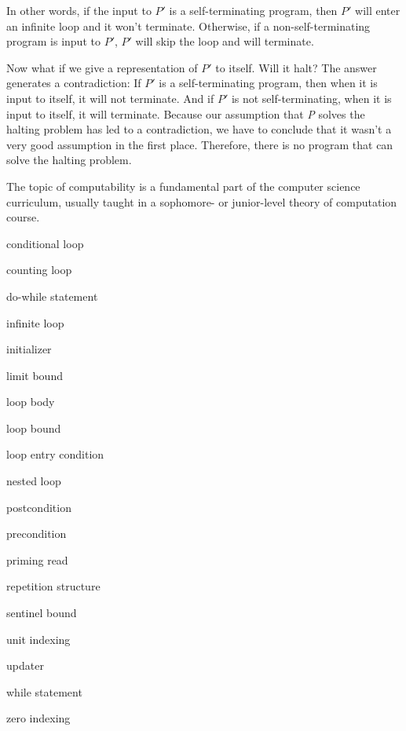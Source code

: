 \noindent In other words, if the input to $P\prime$  is a self-terminating
program, then $P\prime$ will enter an infinite loop and it won't
terminate.  Otherwise, if a non-self-terminating program is input to
$P\prime$, $P\prime$ will skip the loop and will terminate.

Now what if we give a representation of $P\prime$ to itself. Will it halt?
The answer generates a contradiction: If $P\prime$  is a self-terminating
program, then when it is input to itself, it will not terminate.  And
if $P\prime$ is not self-terminating, when it is input to itself, it will
terminate. Because our assumption that {\it P} solves the halting problem
has led to a contradiction, we have to conclude that it wasn't a very
good assumption in the first place. Therefore, there is no program
that can solve the halting problem.

The topic of computability is a fundamental part of the computer
science curriculum, usually taught in a sophomore- or junior-level
theory of computation course.


\begin{KT}
conditional loop

counting loop

do-while statement

infinite loop

initializer

limit bound

loop body

loop bound

loop entry condition

nested loop

postcondition

precondition 

priming read

repetition structure

sentinel bound

unit indexing

updater

while statement

zero indexing

\end{KT}


